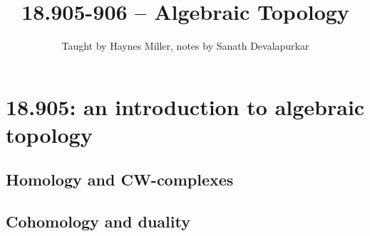 \documentclass[a4paper]{extbook}
\begin{document}
\title{18.905-906 -- Algebraic Topology}
\author{Taught by Haynes Miller, notes by Sanath Devalapurkar}

\frontmatter

\maketitle

\tableofcontents
\newpage

\mainmatter


\part{18.905: an introduction to algebraic topology}\label{905}

\chapter{Homology and CW-complexes}


























\chapter{Cohomology and duality}













\end{document}
